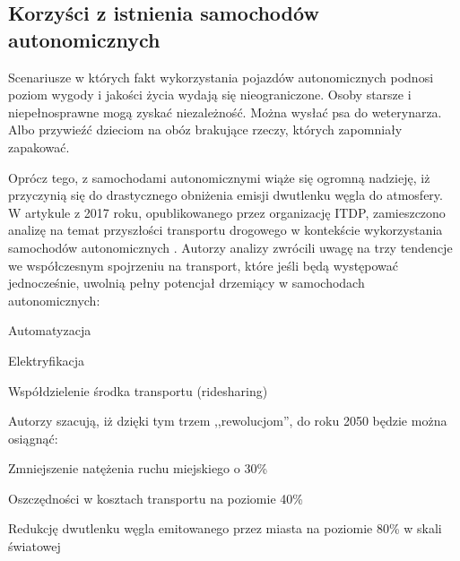\subsection{Korzyści z istnienia samochodów autonomicznych}
Scenariusze w których fakt wykorzystania pojazdów autonomicznych podnosi poziom wygody i jakości życia wydają się nieograniczone. Osoby starsze i niepełnosprawne mogą zyskać niezależność. Można wysłać psa do weterynarza. Albo przywieźć dzieciom na obóz brakujące rzeczy, których zapomniały zapakować.

Oprócz tego, z samochodami autonomicznymi wiąże się ogromną nadzieję, iż przyczynią się do drastycznego obniżenia emisji dwutlenku węgla do atmosfery. W artykule z 2017 roku, opublikowanego przez organizację ITDP, zamieszczono analizę na temat przyszłości transportu drogowego w kontekście wykorzystania samochodów autonomicznych \cite{itdp:urbanTransportRevolutions}. Autorzy analizy zwrócili uwagę na trzy tendencje we współczesnym spojrzeniu na transport, które jeśli będą występować jednocześnie, uwolnią pełny potencjał drzemiący w samochodach autonomicznych:
\begin{itemize*}
\item Automatyzacja
\item Elektryfikacja
\item Współdzielenie środka transportu (ridesharing)
\end{itemize*}
\newpage
Autorzy szacują, iż dzięki tym trzem ,,rewolucjom'', do roku 2050 będzie można osiągnąć:
\begin{enumerate*}
\item Zmniejszenie natężenia ruchu miejskiego o 30\%
\item Oszczędności w kosztach transportu na poziomie 40\%
\item Redukcję dwutlenku węgla emitowanego przez miasta na poziomie 80\% w skali światowej
\end{enumerate*}

